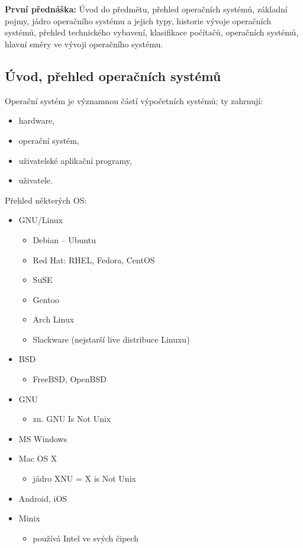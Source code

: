 \documentclass[a4paper, 11pt]{article}
\begin{document}
\section{} \label{start-of-doc}
\textbf{První přednáška:} Úvod do předmětu, přehled operačních systémů, základní pojmy, jádro operačního systému a jejich typy, historie vývoje operačních systémů, přehled technického vybavení, klasifikace počítačů, operačních systémů, hlavní směry ve vývoji operačního systému.

\subsection{Úvod, přehled operačních systémů}
Operační systém je významnou částí výpočetních systémů; ty zahrnují:
\begin{itemize}
    \item hardware, 
    \item operační systém,
    \item uživatelské aplikační programy,
    \item uživatele.
\end{itemize}

Přehled některých OS:
\begin{itemize}
    \item GNU/Linux 
    \begin{itemize}
        \item Debian -- Ubuntu 
        \item Red Hat: RHEL, Fedora, CentOS 
        \item SuSE 
        \item Gentoo
        \item Arch Linux
        \item Slackware (nejstarší live distribuce Linuxu)
    \end{itemize}
    \item BSD 
    \begin{itemize}
        \item FreeBSD, OpenBSD 
    \end{itemize}
    \item GNU
    \begin{itemize}
        \item zn. GNU Is Not Unix
    \end{itemize}
    \item MS Windows 
    \item Mac OS X
    \begin{itemize}
        \item jádro XNU = X is Not Unix
    \end{itemize}
    \item Android, iOS
    \item Minix
    \begin{itemize}
        \item používá Intel ve svých čipech
    \end{itemize}
\end{itemize}
\newpage
\end{document}
